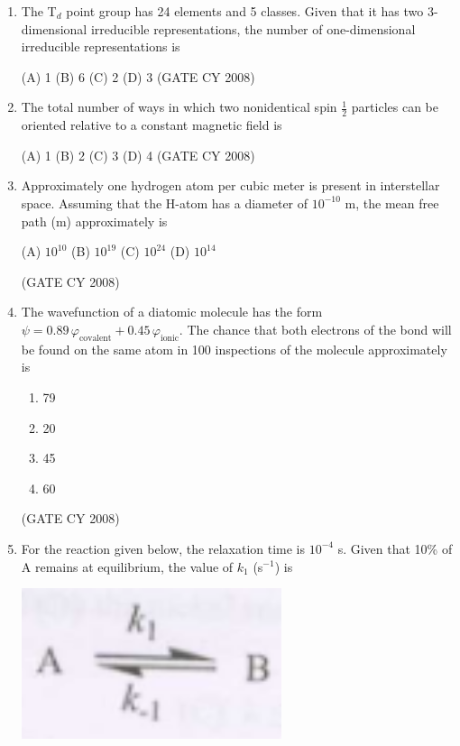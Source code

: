 \documentclass[12pt]{article}
\begin{document}
\begin{enumerate}
\item The T$_d$ point group has 24 elements and 5 classes. Given that it has two 3-dimensional irreducible representations, the number of one-dimensional irreducible representations is
\begin{multicols}{2}
(A) 1
(B) 6
(C) 2
(D) 3    \hfill{(GATE CY 2008)}
\end{multicols}


\item The total number of ways in which two nonidentical spin $\frac{1}{2}$ particles can be oriented relative to a constant magnetic field is
\begin{multicols}{2}
(A) 1
(B) 2
(C) 3
(D) 4    \hfill{(GATE CY 2008)}
\end{multicols}

\item Approximately one hydrogen atom per cubic meter is present in interstellar space. Assuming that the H-atom has a diameter of $10^{-10}$ m, the mean free path (m) approximately is

\begin{multicols}{4}
    
(A) $10^{10}$
(B) $10^{19}$
(C) $10^{24}$
(D) $10^{14}$
\end{multicols}    \hfill{(GATE CY 2008)}


\item The wavefunction of a diatomic molecule has the form $\psi = 0.89\, \varphi_{\text{covalent}} + 0.45\, \varphi_{\text{ionic}}$. The chance that both electrons of the bond will be found on the same atom in 100 inspections of the molecule approximately is

\begin{enumerate}
\item[(A)] 79
\item[(B)] 20
\item[(C)] 45
\item[(D)] 60
\end{enumerate}    \hfill{(GATE CY 2008)}




\item For the reaction given below, the relaxation time is $10^{-4}$ s. Given that 10\% of A remains at equilibrium, the value of $k_1$ (s$^{-1}$) is

\begin{center}
\includegraphics[width=0.6\textwidth]{figs/q58.png}
\end{center}


\end{enumerate}
\end{document}
